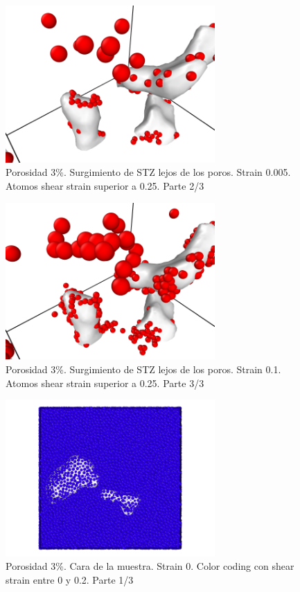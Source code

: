 \documentclass[10pt, oneside]{article} %
\begin{document}
\begin{figure}[H]
\centering
\includegraphics[width=8cm]{Figures/porosidad_STZObservation_3_0005.png}
\caption{Porosidad 3\%. Surgimiento de STZ lejos de los poros. Strain 0.005. Atomos shear strain superior a 0.25. Parte 2/3}
\end{figure}

\begin{figure}[H]
\centering
\includegraphics[width=8cm]{Figures/porosidad_STZObservation_3_01.png}
\caption{Porosidad 3\%. Surgimiento de STZ lejos de los poros. Strain 0.1. Atomos shear strain superior a 0.25. Parte 3/3}
\end{figure}

\begin{figure}[H]
\centering
\includegraphics[width=8cm]{Figures/porosidad_3_faceAS_0_02.png}
\caption{Porosidad 3\%. Cara de la muestra. Strain 0. Color coding con shear strain entre 0 y 0.2. Parte 1/3}
\end{figure}
\end{document}
